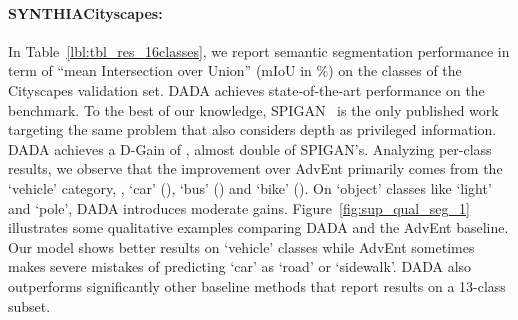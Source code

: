 \documentclass[10pt,twocolumn,letterpaper]{article}
\begin{document}
\paragraph{SYNTHIACityscapes:}
In Table~\ref{lbl:tbl_res_16classes}, we report semantic segmentation performance in term of ``mean Intersection over Union'' (mIoU in \%) on the  classes of the Cityscapes validation set.
DADA achieves state-of-the-art performance on the benchmark.
To the best of our knowledge, SPIGAN~\cite{lee2018spigan} is the only published work targeting the same problem that also considers depth as privileged information.
DADA achieves a D-Gain of , almost double of SPIGAN's.
Analyzing per-class results, we observe that the improvement over AdvEnt \cite{vu2018advent} primarily comes from the `vehicle' category, \ie, `car' (), `bus' () and `bike' ().
On `object' classes like `light' and `pole', DADA introduces moderate gains.
Figure~\ref{fig:sup_qual_seg_1} illustrates some qualitative examples comparing DADA and the AdvEnt baseline.
Our model shows better results on `vehicle' classes while AdvEnt sometimes makes severe mistakes of predicting `car' as `road' or `sidewalk'.
DADA also outperforms significantly other baseline methods that report results on a 13-class subset.
\end{document}
